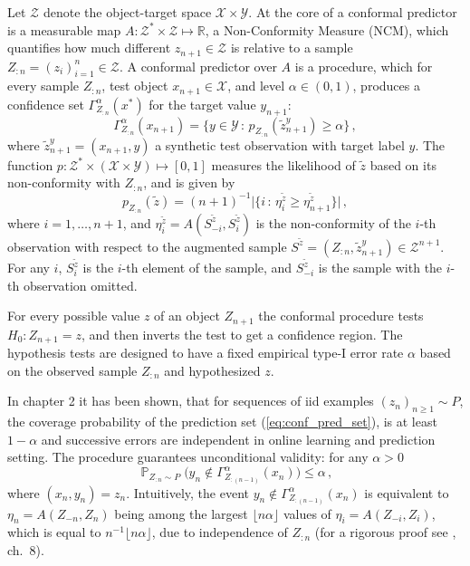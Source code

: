 \documentclass[10pt, conference, compsocconf]{IEEEtran}
\newcommand{\pr}{\mathop{\mathbb{P}}\nolimits}
\newcommand{\Xcal}{\mathcal{X}}
\newcommand{\Ycal}{\mathcal{Y}}
\newcommand{\Zcal}{\mathcal{Z}}
\newcommand{\Real}{\mathbb{R}}
\begin{document}
Let $\Zcal$ denote the object-target space $\Xcal \times \Ycal$. At the core of a
conformal predictor is a measurable map $A: \Zcal^*\times \Zcal \mapsto \Real$, a
Non-Conformity Measure (NCM), which quantifies how much different $z_{n+1} \in \Zcal$
is relative to a sample $Z_{:n} = (z_i)_{i=1}^n\in\Zcal$. A conformal predictor over
$A$ is a procedure, which for every sample $Z_{:n}$, test object $x_{n+1} \in \Xcal$,
and level $\alpha \in (0,1)$, produces a confidence set $\Gamma_{Z_{:n}}^\alpha(x^*)$
for the target value $y_{n+1}$:
\begin{equation} \label{eq:conf_pred_set}
  \Gamma_{Z_{:n}}^\alpha(x_{n+1})
    = \bigl\{ y\in \Ycal \,:\, p_{Z_{:n}}(\tilde{z}^y_{n+1}) \geq \alpha \bigr\} \,,
\end{equation}
where $\tilde{z}^y_{n+1} = (x_{n+1}, y)$ a synthetic test observation with target
label $y$. The function $p:\Zcal^*\times (\Xcal\times \Ycal)\mapsto [0,1]$ measures
the likelihood of $\tilde{z}$ based on its non-conformity with $Z_{:n}$, and is given
by
\begin{equation} \label{eq:conf_p_value}
  p_{Z_{:n}}(\tilde{z})
    = (n+1)^{-1} \bigl\lvert\{ i \,:\,
      \eta_i^{\tilde{z}} \geq \eta_{n+1}^{\tilde{z}} \}\bigr\rvert \,,
\end{equation}
where $i=1,\ldots, n+1$, and $\eta_i^{\tilde{z}} = A(S^{\tilde{z}}_{-i}, S^{\tilde{z}}_i)$
is the non-conformity of the $i$-th observation with respect to the augmented sample
$S^{\tilde{z}} = (Z_{:n}, {\tilde{z}}^y_{n+1}) \in \Zcal^{n+1}$. For any $i$, $S^{\tilde{z}}_i$
is the $i$-th element of the sample, and $S^{\tilde{z}}_{-i}$ is the sample with the $i$-th
observation omitted.

For every possible value $z$ of an object $Z_{n+1}$ the conformal procedure tests
$H_0: Z_{n+1} = z$, and then inverts the test to get a confidence region. The hypothesis
tests are designed to have a fixed empirical type-I error rate $\alpha$ based on
the observed sample $Z_{:n}$ and hypothesized $z$.

In \cite{vovk2005} chapter 2 it has been shown, that for sequences of iid examples
$(z_n)_{n \geq1} \sim P$, the coverage probability of the prediction set (\ref{eq:conf_pred_set}),
is at least $1-\alpha$ and successive errors are independent in online learning and
prediction setting. The procedure guarantees unconditional validity: for any $\alpha > 0$
\begin{equation} \label{eq:conservative_coverage}
  \pr_{Z_{:n}\sim P} \bigl(
    y_n \notin \Gamma^\alpha_{Z_{:(n-1)}}(x_n)
  \bigr) \leq \alpha \,,
\end{equation} 
where $(x_n, y_n) = z_n$.
Intuitively, the event $y_n \notin \Gamma^\alpha_{Z_{:(n-1)}}(x_n)$ is equivalent
to $\eta_n = A(Z_{-n}, Z_n)$ being among the largest $\lfloor n\alpha\rfloor$ values
of $\eta_i = A(Z_{-i}, Z_i)$, which is equal to $n^{-1}\lfloor n\alpha\rfloor$, due
to independence of $Z_{:n}$ (for a rigorous proof see \cite{vovk2005}, ch.~8).
\end{document}

